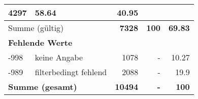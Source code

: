 \begin{longtable}{lXrrr}
       \num{4297} &
       \num[round-mode=places,round-precision=2]{58.64} &
         \num[round-mode=places,round-precision=2]{40.95} \\
     \midrule
     \multicolumn{2}{l}{Summe (gültig)} &
       \textbf{\num{7328}} &
     \textbf{\num{100}} &
       \textbf{\num[round-mode=places,round-precision=2]{69.83}} \\
     \multicolumn{5}{l}{\textbf{Fehlende Werte}}\\
       -998 &
       keine Angabe &
         \num{1078} &
        - &
         \num[round-mode=places,round-precision=2]{10.27} \\
       -989 &
       filterbedingt fehlend &
         \num{2088} &
        - &
         \num[round-mode=places,round-precision=2]{19.9} \\
     \midrule
     \multicolumn{2}{l}{\textbf{Summe (gesamt)}} &
          \textbf{\num{10494}} &
        \textbf{-} &
        \textbf{\num{100}} \\
     \bottomrule
     \end{longtable}
     
